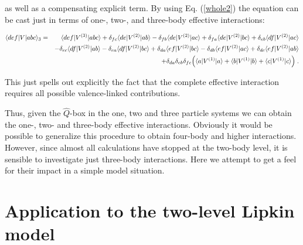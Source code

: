 \documentclass[prc,aps,amsmath,amssymb,preprintnumbers,showpacs,twocolumn]{revtex4}
\newcommand{\bq}{\begin{eqnarray}}
\newcommand{\eq}{\end{eqnarray}}
\begin{document}
as well as a compensating explicit term. By using 
Eq. (\ref{whole2}) the equation can be cast just in terms of one-, 
two-, and three-body effective interactions:
\begin{widetext}
\bq
\langle def|V|abc\rangle_3&=&\langle def|V^{(3)}|abc\rangle
+\delta_{fc}\langle de|V^{(2)}|ab\rangle-\delta_{fb}
\langle de|V^{(2)}|ac\rangle+\delta_{fa}\langle de|V^{(2)}|bc\rangle
+\delta_{eb}\langle df|V^{(2)}|ac\rangle\nonumber\\
&&-\delta_{ec}\langle df|V^{(2)}|ab\rangle-\delta_{ea}
\langle df|V^{(2)}|bc\rangle+\delta_{da}\langle ef|V^{(2)}|bc\rangle
-\delta_{db}\langle ef|V^{(2)}|ac\rangle
+\delta_{dc}\langle ef|V^{(2)}|ab\rangle\nonumber\\
&&
+\delta_{da}\delta_{eb}\delta_{fc}
\Bigl(\langle a|V^{(1)}|a\rangle+\langle b|V^{(1)}|b\rangle
+\langle c|V^{(1)}|c\rangle\Bigr)\;. \label{whole3p}
\eq
\end{widetext}
This just spells out explicitly the fact that the complete effective
interaction requires all possible valence-linked contributions.

Thus, given the $\hat{Q}$-box in the one, two and three particle systems
we can obtain the one-, two- and three-body effective interactions. 
Obviously it would be possible to generalize this procedure to obtain 
four-body and higher interactions.   %
However, since almost all calculations 
have stopped at the two-body level, it is sensible to investigate just 
three-body interactions. Here we attempt to get a feel for their impact 
in a simple model situation.

\section{Application to the two-level Lipkin model\label{seciii}}
\end{document}
